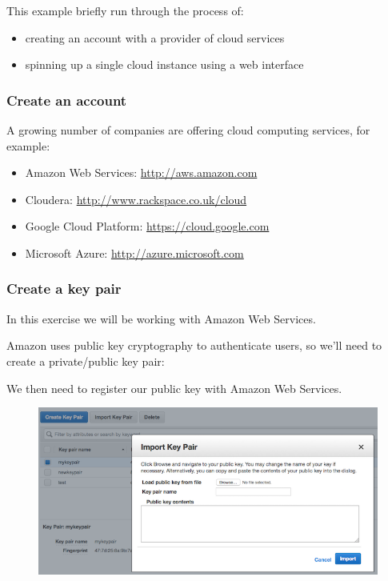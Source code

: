 This example briefly run through the process of:

\begin{itemize}
\itemsep1pt\parskip0pt
\item
  creating an account with a provider of cloud services
\item
  spinning up a single cloud instance using a web interface
\end{itemize}

\subsubsection{Create an account}\label{create-an-account}

A growing number of companies are offering cloud computing services, for
example:

\begin{itemize}
\itemsep1pt\parskip0pt
\item
  Amazon Web Services: \url{http://aws.amazon.com}
\item
  Cloudera: \url{http://www.rackspace.co.uk/cloud}
\item
  Google Cloud Platform: \url{https://cloud.google.com}
\item
  Microsoft Azure: \url{http://azure.microsoft.com}
\end{itemize}

\subsubsection{Create a key pair}\label{create-a-key-pair}

In this exercise we will be working with Amazon Web Services.

Amazon uses public key cryptography to authenticate users, so we'll need
to create a private/public key pair:

\begin{Shaded}
\begin{Highlighting}[]
\NormalTok{$ } 
\end{Highlighting}
\end{Shaded}

We then need to register our public key with Amazon Web Services.

\begin{figure}[htbp]
\centering
\includegraphics{97Cloud/figures/key_pair.png}
\end{figure}

